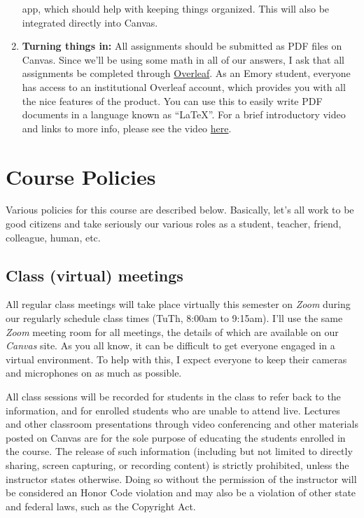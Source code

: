 \documentclass[11pt,]{article}
\begin{document}
\begin{enumerate}
  app, which should help with keeping things organized. This will also
  be integrated directly into Canvas.
\item
  \textbf{Turning things in:} All assignments should be submitted as PDF
  files on Canvas. Since we'll be using some math in all of our answers,
  I ask that all assignments be completed through
  \href{https://www.overleaf.com/}{Overleaf}. As an Emory student,
  everyone has access to an institutional Overleaf account, which
  provides you with all the nice features of the product. You can use
  this to easily write PDF documents in a language known as ``LaTeX''.
  For a brief introductory video and links to more info, please see the
  video
  \href{https://www.overleaf.com/learn/latex/Questions/Getting_started_with_LaTeX_and_Overleaf_(formerly_writeLaTeX)}{here}.
\end{enumerate}

\hypertarget{course-policies}{%
\section{Course Policies}\label{course-policies}}

Various policies for this course are described below. Basically, let's
all work to be good citizens and take seriously our various roles as a
student, teacher, friend, colleague, human, etc.

\hypertarget{class-virtual-meetings}{%
\subsection{Class (virtual) meetings}\label{class-virtual-meetings}}

All regular class meetings will take place virtually this semester on
\emph{Zoom} during our regularly schedule class times (TuTh, 8:00am to
9:15am). I'll use the same \emph{Zoom} meeting room for all meetings,
the details of which are available on our \emph{Canvas} site. As you all
know, it can be difficult to get everyone engaged in a virtual
environment. To help with this, I expect everyone to keep their cameras
and microphones on as much as possible.

All class sessions will be recorded for students in the class to refer
back to the information, and for enrolled students who are unable to
attend live. Lectures and other classroom presentations through video
conferencing and other materials posted on Canvas are for the sole
purpose of educating the students enrolled in the course. The release of
such information (including but not limited to directly sharing, screen
capturing, or recording content) is strictly prohibited, unless the
instructor states otherwise. Doing so without the permission of the
instructor will be considered an Honor Code violation and may also be a
violation of other state and federal laws, such as the Copyright Act.
\end{document}
